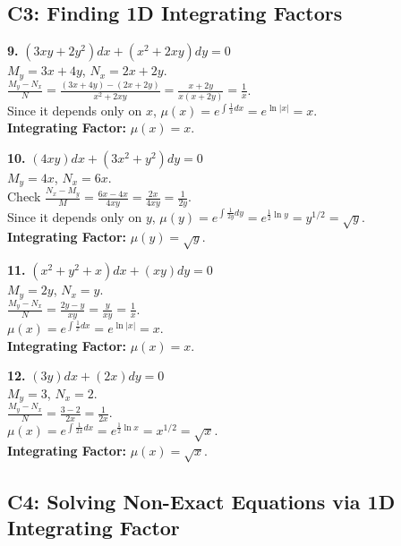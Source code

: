 \documentclass[11pt]{article}
\begin{document}
\subsection*{C3: Finding 1D Integrating Factors}

\textbf{9.} $(3xy + 2y^2) dx + (x^2 + 2xy) dy = 0$ \\
$M_y = 3x + 4y$, $N_x = 2x + 2y$. \\
$\frac{M_y - N_x}{N} = \frac{(3x+4y) - (2x+2y)}{x^2+2xy} = \frac{x+2y}{x(x+2y)} = \frac{1}{x}$. \\
Since it depends only on $x$, $\mu(x) = e^{\int \frac{1}{x} dx} = e^{\ln|x|} = x$. \\
\textbf{Integrating Factor:} $\mu(x) = x$.

\vspace{0.5cm}
\textbf{10.} $(4xy) dx + (3x^2 + y^2) dy = 0$ \\
$M_y = 4x$, $N_x = 6x$. \\
Check $\frac{N_x - M_y}{M} = \frac{6x - 4x}{4xy} = \frac{2x}{4xy} = \frac{1}{2y}$. \\
Since it depends only on $y$, $\mu(y) = e^{\int \frac{1}{2y} dy} = e^{\frac{1}{2}\ln y} = y^{1/2} = \sqrt{y}$. \\
\textbf{Integrating Factor:} $\mu(y) = \sqrt{y}$.

\vspace{0.5cm}
\textbf{11.} $(x^2 + y^2 + x) dx + (xy) dy = 0$ \\
$M_y = 2y$, $N_x = y$. \\
$\frac{M_y - N_x}{N} = \frac{2y - y}{xy} = \frac{y}{xy} = \frac{1}{x}$. \\
$\mu(x) = e^{\int \frac{1}{x} dx} = e^{\ln|x|} = x$. \\
\textbf{Integrating Factor:} $\mu(x) = x$.

\vspace{0.5cm}
\textbf{12.} $(3y) dx + (2x) dy = 0$ \\
$M_y = 3$, $N_x = 2$. \\
$\frac{M_y - N_x}{N} = \frac{3 - 2}{2x} = \frac{1}{2x}$. \\
$\mu(x) = e^{\int \frac{1}{2x} dx} = e^{\frac{1}{2}\ln x} = x^{1/2} = \sqrt{x}$. \\
\textbf{Integrating Factor:} $\mu(x) = \sqrt{x}$.

\subsection*{C4: Solving Non-Exact Equations via 1D Integrating Factor}
\end{document}
